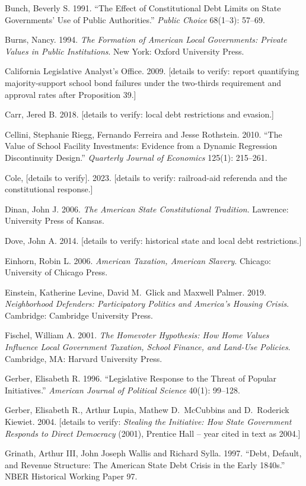 Bunch, Beverly S. 1991. ``The Effect of Constitutional Debt Limits on State Governments' Use of Public Authorities.'' \emph{Public Choice} 68(1--3): 57--69.

Burns, Nancy. 1994. \emph{The Formation of American Local Governments: Private Values in Public Institutions}. New York: Oxford University Press.

California Legislative Analyst's Office. 2009. [details to verify: report quantifying majority-support school bond failures under the two-thirds requirement and approval rates after Proposition 39.]

Carr, Jered B. 2018. [details to verify: local debt restrictions and evasion.]

Cellini, Stephanie Riegg, Fernando Ferreira and Jesse Rothstein. 2010. ``The Value of School Facility Investments: Evidence from a Dynamic Regression Discontinuity Design.'' \emph{Quarterly Journal of Economics} 125(1): 215--261.

Cole, [details to verify]. 2023. [details to verify: railroad-aid referenda and the constitutional response.]

Dinan, John J. 2006. \emph{The American State Constitutional Tradition}. Lawrence: University Press of Kansas.

Dove, John A. 2014. [details to verify: historical state and local debt restrictions.]

Einhorn, Robin L. 2006. \emph{American Taxation, American Slavery}. Chicago: University of Chicago Press.

Einstein, Katherine Levine, David M.\ Glick and Maxwell Palmer. 2019. \emph{Neighborhood Defenders: Participatory Politics and America's Housing Crisis}. Cambridge: Cambridge University Press.

Fischel, William A. 2001. \emph{The Homevoter Hypothesis: How Home Values Influence Local Government Taxation, School Finance, and Land-Use Policies}. Cambridge, MA: Harvard University Press.

Gerber, Elisabeth R. 1996. ``Legislative Response to the Threat of Popular Initiatives.'' \emph{American Journal of Political Science} 40(1): 99--128.

Gerber, Elisabeth R., Arthur Lupia, Mathew D.\ McCubbins and D.\ Roderick Kiewiet. 2004. [details to verify: \emph{Stealing the Initiative: How State Government Responds to Direct Democracy} (2001), Prentice Hall -- year cited in text as 2004.]

Grinath, Arthur III, John Joseph Wallis and Richard Sylla. 1997. ``Debt, Default, and Revenue Structure: The American State Debt Crisis in the Early 1840s.'' NBER Historical Working Paper 97.

